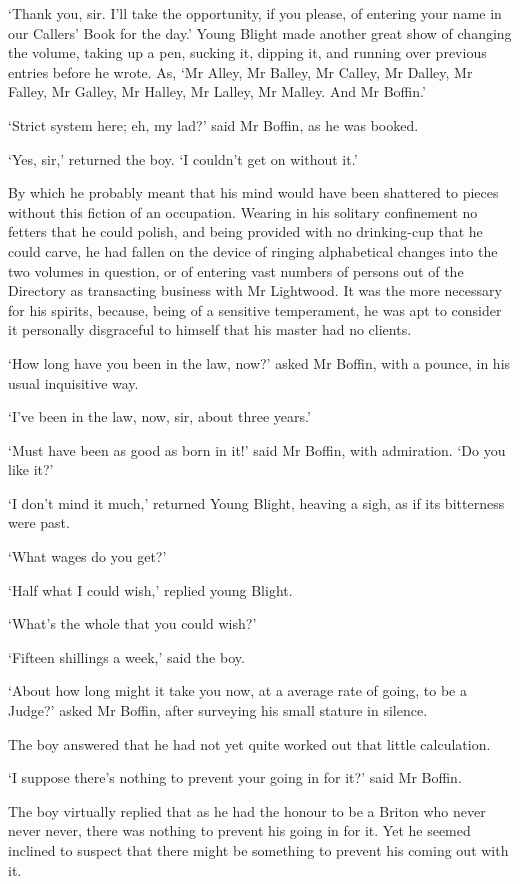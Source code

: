 ‘Thank you, sir. I’ll take the opportunity, if you please, of entering
your name in our Callers’ Book for the day.’ Young Blight made another
great show of changing the volume, taking up a pen, sucking it, dipping
it, and running over previous entries before he wrote. As, ‘Mr Alley,
Mr Balley, Mr Calley, Mr Dalley, Mr Falley, Mr Galley, Mr Halley, Mr
Lalley, Mr Malley. And Mr Boffin.’

‘Strict system here; eh, my lad?’ said Mr Boffin, as he was booked.

‘Yes, sir,’ returned the boy. ‘I couldn’t get on without it.’

By which he probably meant that his mind would have been shattered to
pieces without this fiction of an occupation. Wearing in his solitary
confinement no fetters that he could polish, and being provided with no
drinking-cup that he could carve, he had fallen on the device of ringing
alphabetical changes into the two volumes in question, or of entering
vast numbers of persons out of the Directory as transacting business
with Mr Lightwood. It was the more necessary for his spirits, because,
being of a sensitive temperament, he was apt to consider it personally
disgraceful to himself that his master had no clients.

‘How long have you been in the law, now?’ asked Mr Boffin, with a
pounce, in his usual inquisitive way.

‘I’ve been in the law, now, sir, about three years.’

‘Must have been as good as born in it!’ said Mr Boffin, with admiration.
‘Do you like it?’

‘I don’t mind it much,’ returned Young Blight, heaving a sigh, as if its
bitterness were past.

‘What wages do you get?’

‘Half what I could wish,’ replied young Blight.

‘What’s the whole that you could wish?’

‘Fifteen shillings a week,’ said the boy.

‘About how long might it take you now, at a average rate of going, to be
a Judge?’ asked Mr Boffin, after surveying his small stature in silence.

The boy answered that he had not yet quite worked out that little
calculation.

‘I suppose there’s nothing to prevent your going in for it?’ said Mr
Boffin.

The boy virtually replied that as he had the honour to be a Briton who
never never never, there was nothing to prevent his going in for it. Yet
he seemed inclined to suspect that there might be something to prevent
his coming out with it.

